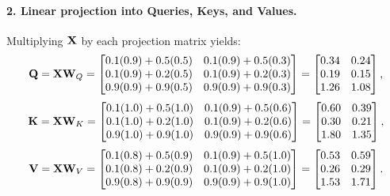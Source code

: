 \documentclass[../../main.tex]{subfiles}
\begin{document}
\paragraph{2. Linear projection into Queries, Keys, and Values.}
Multiplying $\mathbf{X}$ by each projection matrix yields:
\begin{equation}
\mathbf{Q} = \mathbf{X} \mathbf{W}_Q = \begin{bmatrix}
0.1(0.9) + 0.5(0.5) & 0.1(0.9) + 0.5(0.3) \\
0.1(0.9) + 0.2(0.5) & 0.1(0.9) + 0.2(0.3) \\
0.9(0.9) + 0.9(0.5) & 0.9(0.9) + 0.9(0.3)
\end{bmatrix} = \begin{bmatrix}
0.34 & 0.24 \\
0.19 & 0.15 \\
1.26 & 1.08
\end{bmatrix},
\end{equation}
\begin{equation}
\mathbf{K} = \mathbf{X} \mathbf{W}_K = \begin{bmatrix}
0.1(1.0) + 0.5(1.0) & 0.1(0.9) + 0.5(0.6) \\
0.1(1.0) + 0.2(1.0) & 0.1(0.9) + 0.2(0.6) \\
0.9(1.0) + 0.9(1.0) & 0.9(0.9) + 0.9(0.6)
\end{bmatrix} = \begin{bmatrix}
0.60 & 0.39 \\
0.30 & 0.21 \\
1.80 & 1.35
\end{bmatrix},
\end{equation}
\begin{equation}
\mathbf{V} = \mathbf{X} \mathbf{W}_V = \begin{bmatrix}
0.1(0.8) + 0.5(0.9) & 0.1(0.9) + 0.5(1.0) \\
0.1(0.8) + 0.2(0.9) & 0.1(0.9) + 0.2(1.0) \\
0.9(0.8) + 0.9(0.9) & 0.9(0.9) + 0.9(1.0)
\end{bmatrix} = \begin{bmatrix}
0.53 & 0.59 \\
0.26 & 0.29 \\
1.53 & 1.71
\end{bmatrix}.
\end{equation}
\end{document}
